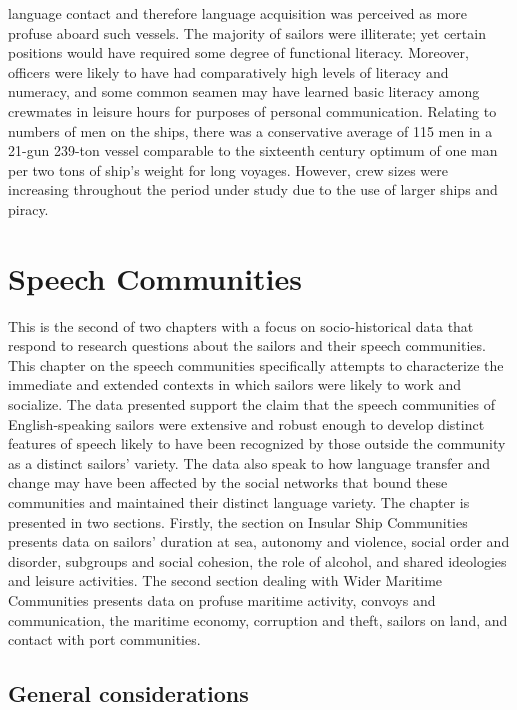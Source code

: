 language contact and therefore language acquisition was perceived as more profuse aboard such vessels. The majority of sailors were illiterate; yet certain positions would have required some degree of functional literacy. Moreover, officers were likely to have had comparatively high levels of literacy and numeracy, and some common seamen may have learned basic literacy among crewmates in leisure hours for purposes of personal communication. Relating to numbers of men on the ships, there was a conservative average of 115 men in a 21-gun 239-ton vessel comparable to the sixteenth century optimum of one man per two tons of ship’s weight for long voyages. However, crew sizes were increasing throughout the period under study due to the use of larger ships and piracy. 

  \chapter{  {Speech} {Communities}}

This is the second of two chapters with a focus on socio-historical data that respond to research questions about the sailors and their speech communities. This chapter on the speech communities specifically attempts to characterize the immediate and extended contexts in which sailors were likely to work and socialize. The data presented support the claim that the speech communities of English-speaking sailors were extensive and robust enough to develop distinct features of speech likely to have been recognized by those outside the community as a distinct sailors’ variety. The data also speak to how language transfer and change may have been affected by the social networks that bound these communities and maintained their distinct language variety. The chapter is presented in two sections. Firstly, the section on Insular Ship Communities presents data on sailors’ duration at sea, autonomy and violence, social order and disorder, subgroups and social cohesion, the role of alcohol, and shared ideologies and leisure activities. The second section dealing with Wider Maritime Communities presents data on profuse maritime activity, convoys and communication, the maritime economy, corruption and theft, sailors on land, and contact with port communities. 

\section{{General} {considerations}}%

